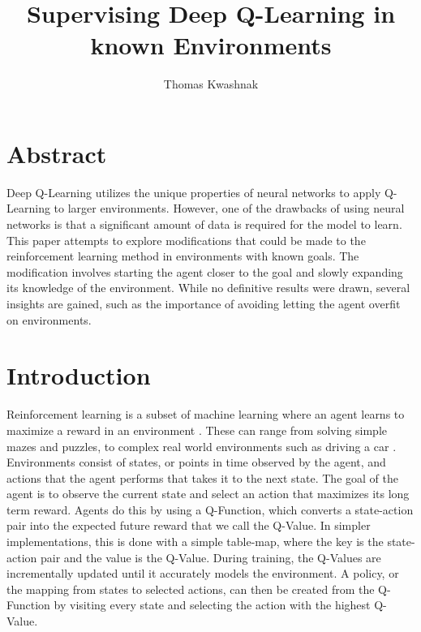 \documentclass[12pt]{article}
\author{Thomas Kwashnak}
\title{Supervising Deep Q-Learning in known Environments}
\begin{document}
\maketitle

\newpage

\section{Abstract}

Deep Q-Learning utilizes the unique properties of neural networks to apply Q-Learning to larger environments.
However, one of the drawbacks of using neural networks is that a significant amount of data is required for the model to learn.
This paper attempts to explore modifications that could be made to the reinforcement learning method in environments with known goals.
The modification involves starting the agent closer to the goal and slowly expanding its knowledge of the environment.
While no definitive results were drawn, several insights are gained, such as the importance of avoiding letting the agent overfit on environments.

\section{Introduction}

Reinforcement learning is a subset of machine learning where an agent learns to maximize a reward in an environment \cite{article_reinforcement_learning_survey}.
These can range from solving simple mazes and puzzles, to complex real world environments such as driving a car \cite{article_deep_learning_hybrid_quantum}.
Environments consist of states, or points in time observed by the agent, and actions that the agent performs that takes it to the next state.
The goal of the agent is to observe the current state and select an action that maximizes its long term reward.
Agents do this by using a Q-Function, which converts a state-action pair into the expected future reward that we call the Q-Value.
In simpler implementations, this is done with a simple table-map, where the key is the state-action pair and the value is the Q-Value.
During training, the Q-Values are incrementally updated until it accurately models the environment.
A policy, or the mapping from states to selected actions, can then be created from the Q-Function by visiting every state and selecting the action with the highest Q-Value.
\end{document}
